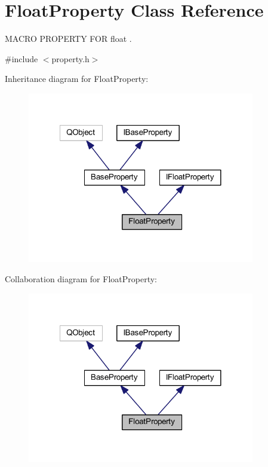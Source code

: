 \hypertarget{class_float_property}{\section{Float\-Property Class Reference}
\label{class_float_property}
}


M\-A\-C\-R\-O P\-R\-O\-P\-E\-R\-T\-Y F\-O\-R float .  




{\ttfamily \#include $<$property.\-h$>$}



Inheritance diagram for Float\-Property\-:
\nopagebreak
\begin{figure}[H]
\begin{center}
\leavevmode
\includegraphics[width=281pt]{class_float_property__inherit__graph}
\end{center}
\end{figure}


Collaboration diagram for Float\-Property\-:
\nopagebreak
\begin{figure}[H]
\begin{center}
\leavevmode
\includegraphics[width=281pt]{class_float_property__coll__graph}
\end{center}
\end{figure}
